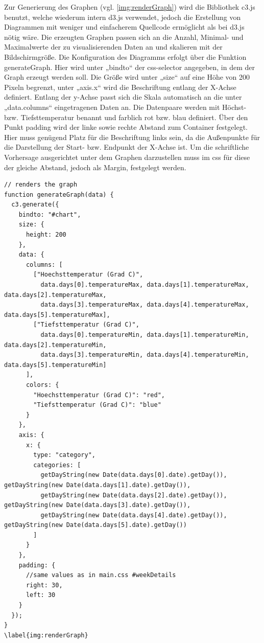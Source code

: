 Zur Generierung des Graphen (vgl. \ref{img:renderGraph}) wird die Bibliothek c3.js benutzt, welche wiederum intern d3.js verwendet, jedoch die Erstellung von Diagrammen mit weniger und einfacherem Quellcode ermöglicht als bei d3.js nötig wäre. Die erzeugten Graphen passen sich an die Anzahl, Minimal- und Maximalwerte der zu visualisierenden Daten an und skalieren mit der Bildschirmgröße. Die Konfiguration des Diagramms erfolgt über die Funktion generateGraph. Hier wird unter „bindto“ der css-selector angegeben, in dem der Graph erzeugt werden soll. Die Größe wird unter „size“ auf eine Höhe von 200 Pixeln begrenzt, unter „axis.x“ wird die Beschriftung entlang der X-Achse definiert. Entlang der y-Achse passt sich die Skala automatisch an die unter „data.columns“ eingetragenen Daten an. Die Datenpaare werden mit Höchst- bzw. Tiefsttemperatur benannt und farblich rot bzw. blau definiert. Über den Punkt padding wird der linke sowie rechte Abstand zum Container festgelegt. Hier muss genügend Platz für die Beschriftung links sein, da die Außenpunkte für die Darstellung der Start- bzw. Endpunkt der X-Achse ist. Um die schriftliche Vorhersage ausgerichtet unter dem Graphen darzustellen muss im css für diese der gleiche Abstand, jedoch als Margin, festgelegt werden.

\begin{lstlisting} 
// renders the graph
function generateGraph(data) {
  c3.generate({
    bindto: "#chart",
    size: {
      height: 200
    },
    data: {
      columns: [
        ["Hoechsttemperatur (Grad C)",
          data.days[0].temperatureMax, data.days[1].temperatureMax, data.days[2].temperatureMax,
          data.days[3].temperatureMax, data.days[4].temperatureMax, data.days[5].temperatureMax],
        ["Tiefsttemperatur (Grad C)",
          data.days[0].temperatureMin, data.days[1].temperatureMin, data.days[2].temperatureMin,
          data.days[3].temperatureMin, data.days[4].temperatureMin, data.days[5].temperatureMin]
      ],
      colors: {
        "Hoechsttemperatur (Grad C)": "red",
        "Tiefsttemperatur (Grad C)": "blue"
      }
    },
    axis: {
      x: {
        type: "category",
        categories: [
          getDayString(new Date(data.days[0].date).getDay()), getDayString(new Date(data.days[1].date).getDay()),
          getDayString(new Date(data.days[2].date).getDay()), getDayString(new Date(data.days[3].date).getDay()),
          getDayString(new Date(data.days[4].date).getDay()), getDayString(new Date(data.days[5].date).getDay())
        ]
      }
    },
    padding: {
      //same values as in main.css #weekDetails
      right: 30,
      left: 30
    }
  });
}
\label{img:renderGraph}
\end{lstlisting}

